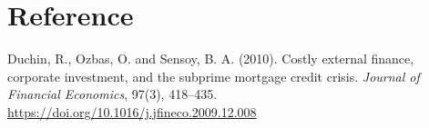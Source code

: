 \section*{Reference}

\begingroup
\raggedright
Duchin, R., Ozbas, O. and Sensoy, B. A. (2010). Costly external finance, corporate investment, and the subprime mortgage credit crisis. \textit{Journal of Financial Economics}, 97(3), 418--435. \href{https://doi.org/10.1016/j.jfineco.2009.12.008}{https://doi.org/10.1016/j.jfineco.2009.12.008}
\par
\endgroup
